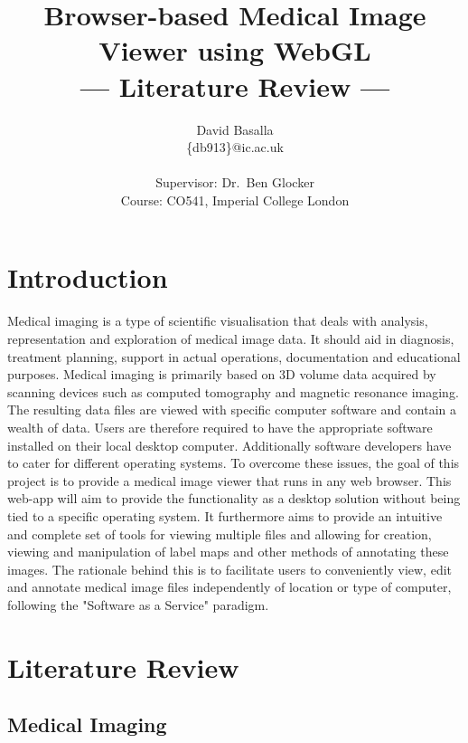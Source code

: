 \documentclass[a4paper,11pt,titlepage]{article}
\title{Browser-based Medical Image Viewer using WebGL \\\Large{--- Literature Review ---}}
\author{David Basalla\\
       \{db913\}@ic.ac.uk\\ \\
       \small{Supervisor: Dr.\ Ben Glocker}\\
       \small{Course: CO541, Imperial College London}
}
\begin{document}
\maketitle

\section{Introduction}
Medical imaging is a type of scientific visualisation that deals with analysis, representation and exploration of medical image data. It should aid in diagnosis, treatment planning, support in actual operations, documentation and educational purposes. Medical imaging is primarily based on 3D volume data acquired by scanning devices such as computed tomography and magnetic resonance imaging. The resulting data files are viewed with specific computer software and contain a wealth of data. Users are therefore required to have the appropriate software installed on their local desktop computer. Additionally software developers have to cater for different operating systems. To overcome these issues, the goal of this project is to provide a medical image viewer that runs in any web browser. This web-app will aim to provide the functionality as a desktop solution without being tied to a specific operating system. It furthermore aims to provide an intuitive and complete set of tools for viewing multiple files and allowing for creation, viewing and manipulation of label maps and other methods of annotating these images. The rationale behind this is to facilitate users to conveniently view, edit and annotate medical image files independently of location or type of computer, following the "Software as a Service" paradigm.

\section{Literature Review}

\subsection{Medical Imaging}
\end{document}
